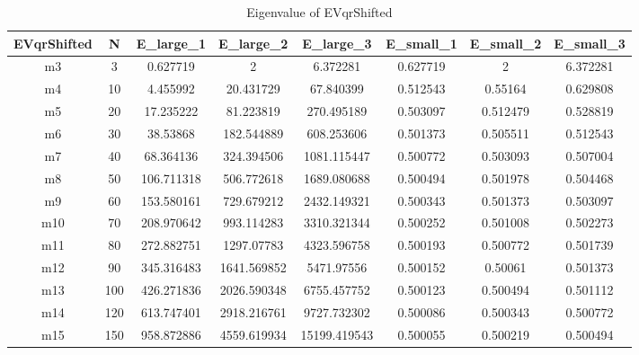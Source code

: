 \documentclass{article}
\begin{document}
\begin{table}[H]
    \begin{center}
        \begin{tabular}{|c|c|c|c|c|c|c|c|}
            \hline
            EVqrShifted & N & E\_large\_1 & E\_large\_2 & E\_large\_3 & E\_small\_1 & E\_small\_2 & E\_small\_3 \\ \hline
            m3 & 3 & 0.627719 & 2 & 6.372281 & 0.627719 & 2 & 6.372281 \\ \hline
            m4 & 10 & 4.455992 & 20.431729 & 67.840399 & 0.512543 & 0.55164 & 0.629808 \\ \hline
            m5 & 20 & 17.235222 & 81.223819 & 270.495189 & 0.503097 & 0.512479 & 0.528819 \\ \hline
            m6 & 30 & 38.53868 & 182.544889 & 608.253606 & 0.501373 & 0.505511 & 0.512543 \\ \hline
            m7 & 40 & 68.364136 & 324.394506 & 1081.115447 & 0.500772 & 0.503093 & 0.507004 \\ \hline
            m8 & 50 & 106.711318 & 506.772618 & 1689.080688 & 0.500494 & 0.501978 & 0.504468 \\ \hline
            m9 & 60 & 153.580161 & 729.679212 & 2432.149321 & 0.500343 & 0.501373 & 0.503097 \\ \hline
            m10 & 70 & 208.970642 & 993.114283 & 3310.321344 & 0.500252 & 0.501008 & 0.502273 \\ \hline
            m11 & 80 & 272.882751 & 1297.07783 & 4323.596758 & 0.500193 & 0.500772 & 0.501739 \\ \hline
            m12 & 90 & 345.316483 & 1641.569852 & 5471.97556 & 0.500152 & 0.50061 & 0.501373 \\ \hline
            m13 & 100 & 426.271836 & 2026.590348 & 6755.457752 & 0.500123 & 0.500494 & 0.501112 \\ \hline
            m14 & 120 & 613.747401 & 2918.216761 & 9727.732302 & 0.500086 & 0.500343 & 0.500772 \\ \hline
            m15 & 150 & 958.872886 & 4559.619934 & 15199.419543 & 0.500055 & 0.500219 & 0.500494 \\ \hline
        \end{tabular}
    \end{center}
    \caption{Eigenvalue of EVqrShifted}
    \label{tab:eigen evqrshifted}
\end{table}
\end{document}
